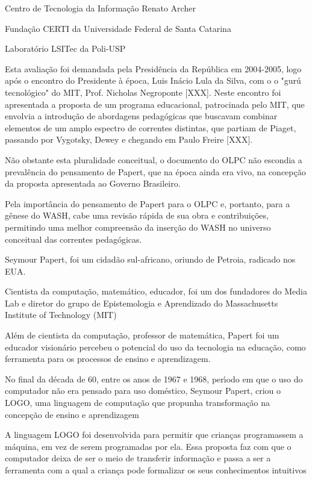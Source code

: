 \documentclass[
12pt,		%
openright,	%
twoside,  %
a4paper,			%
chapter=TITLE,		%
english,			%
french,				%
spanish,			%
brazil				%
]{USPSC-classe/USPSC}
\begin{document}
\begin{alineas}
\item Centro de Tecnologia da Informa\c{c}\~ao Renato Archer
\item Funda\c{c}\~ao CERTI da Universidade Federal de Santa Catarina
\item Laborat\'orio LSITec da Poli-USP
\end{alineas}

Esta avalia\c{c}\~ao foi demandada pela Presid\^encia da Rep\'ublica em 2004-2005, logo ap\'os o encontro do Presidente \`a \'epoca, Luis In\'acio Lula da Silva, com o o "gur\'u tecnol\'ogico" do MIT, Prof. Nicholas Negroponte [XXX]. Neste encontro foi apresentada a proposta de um programa educacional, patrocinada pelo MIT, que envolvia a introdu\c{c}\~ao de abordagens pedag\'ogicas que buscavam combinar elementos de um amplo espectro de correntes distintas, que partiam de Piaget, passando por Vygotsky, Dewey e chegando em Paulo Freire [XXX].


N\~ao obstante esta pluralidade conceitual, o documento do OLPC n\~ao escondia a preval\^encia do pensamento de Papert, que na \'epoca ainda era vivo, na concep\c{c}\~ao da proposta apresentada ao Governo Brasileiro.


Pela import\^ancia do pensamento de Papert para o OLPC e, portanto, para a g\^enese do WASH, cabe uma revis\~ao r\'apida de sua obra e contribui\c{c}\~oes, permitindo uma melhor compreens\~ao da inser\c{c}\~ao do WASH no universo conceitual das correntes pedag\'ogicas.


Seymour Papert, foi um cidad\~ao sul-africano, oriundo de Petroia, radicado nos EUA.


Cientista da computa\c{c}\~ao, matem\'atico, educador, foi um dos fundadores do Media Lab e diretor do grupo de Epistemologia e Aprendizado do Massachusetts Institute of Technology (MIT)


Al\'em de cientista da computa\c{c}\~ao, professor de matem\'atica, Papert foi um educador vision\'ario percebeu o potencial do uso da tecnologia na educa\c{c}\~ao, como ferramenta para os processos de  ensino e aprendizagem.


No final da d\'ecada de 60, entre os anos de 1967 e 1968, per\'{\i}odo em que o uso do computador n\~ao era pensado para uso dom\'estico, Seymour Papert, criou o LOGO, uma linguagem de computa\c{c}\~ao que propunha transforma\c{c}\~ao  na concep\c{c}\~ao de ensino e aprendizagem


A linguagem LOGO  foi desenvolvida para permitir que crian\c{c}as programassem a m\'aquina, em vez de serem programadas por ela. Essa proposta faz com que o computador deixa de ser o meio de transferir informa\c{c}\~ao e passa a ser a ferramenta com a qual a crian\c{c}a pode formalizar os seus conhecimentos intuitivos
\end{document}
